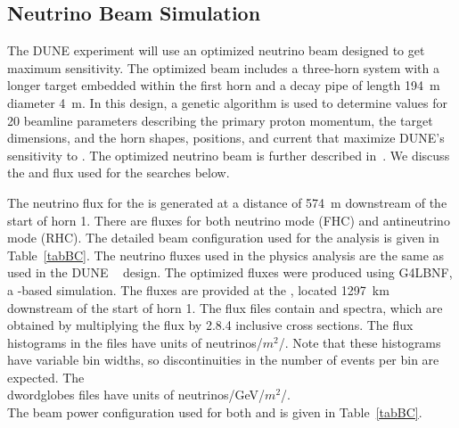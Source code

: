 \subsection{Neutrino Beam Simulation}
The DUNE experiment will use an optimized neutrino beam designed to get maximum  sensitivity. The optimized beam includes  a three-horn system with a longer target embedded within the first horn and a decay pipe of length \SI{194}{m} diameter \SI{4}{m}.  In this design, a genetic algorithm is used to determine values for 20 beamline parameters describing the primary proton momentum, the target dimensions, and the horn shapes, positions, and current that maximize DUNE's sensitivity to . The optimized neutrino beam is further described in~\cite{Laura:2017}. We discuss the  and  flux used for the  searches below. 

The neutrino flux for the  is generated at a distance of \SI{574}{m}  downstream of the start of horn 1. There are fluxes for both neutrino mode (FHC) and antineutrino mode (RHC). The detailed beam configuration used for the   analysis is given in Table~\ref{tabBC}. 
The neutrino fluxes used in the     physics analysis are the same as used in the DUNE ~\cite{Strait:2016mof} design. The optimized fluxes were produced using G4LBNF, a -based simulation.  The  fluxes are provided 
 at the , located \SI{1297}{km} downstream of the start of horn 1. The flux files  contain  and  spectra, which are obtained by multiplying the flux by  2.8.4 
 inclusive cross sections.  The flux histograms in the   files 
 have
units of neutrinos/$m^{2}$/. Note that these histograms have variable bin widths, so discontinuities in the number of events per bin are expected. The \\dword{globes} files have units of neutrinos/GeV/$m^{2}$/.\\
The beam power configuration used for both  and  is given in Table~\ref{tabBC}.

